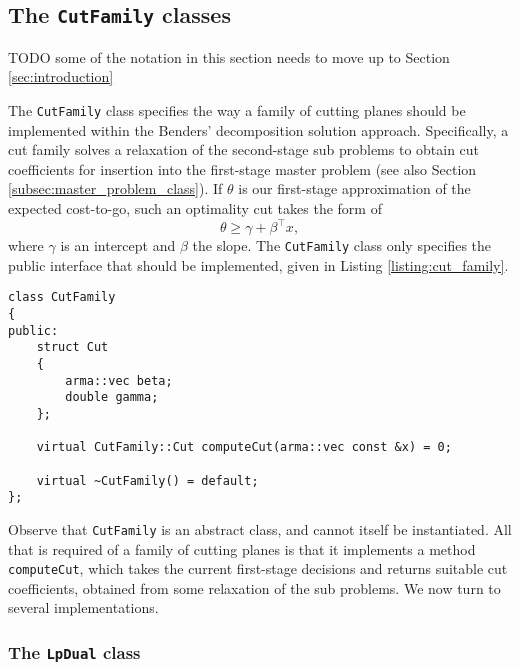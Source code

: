 \documentclass[12pt, english]{article}
\begin{document}
\subsection{The \texttt{CutFamily} classes}
\label{subsec:cut_families}

TODO some of the notation in this section needs to move up to Section \ref{sec:introduction}

The \texttt{CutFamily} class specifies the way a family of cutting planes should be implemented within the Benders' decomposition solution approach. Specifically, a cut family solves a relaxation of the second-stage sub problems to obtain cut coefficients for insertion into the first-stage master problem (see also Section \ref{subsec:master_problem_class}). If $\theta$ is our first-stage approximation of the expected cost-to-go, such an optimality cut takes the form of
\[ \theta \ge \gamma + \beta^\top x, \]
where $\gamma$ is an intercept and $\beta$ the slope. The \texttt{CutFamily} class only specifies the public interface that should be implemented, given in Listing \ref{listing:cut_family}.
\begin{lstlisting}[caption={Public interface of the \texttt{CutFamily} class.}, 
                   label={listing:cut_family}]
class CutFamily
{
public:
	struct Cut
	{
		arma::vec beta;
		double gamma;
	};
	
	virtual CutFamily::Cut computeCut(arma::vec const &x) = 0;
		
	virtual ~CutFamily() = default;
};
\end{lstlisting}
Observe that \texttt{CutFamily} is an abstract class, and cannot itself be instantiated. All that is required of a family of cutting planes is that it implements a method \texttt{computeCut}, which takes the current first-stage decisions and returns suitable cut coefficients, obtained from some relaxation of the sub problems. We now turn to several implementations.

\subsubsection{The \texttt{LpDual} class}
\label{subsubsec:lpdual}
\end{document}
